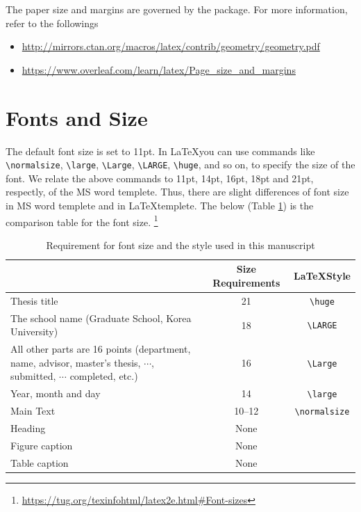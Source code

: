 \documentclass{report}
\begin{document}
The paper size and margins are governed by the  package.
For more information, refer to the followings
\begin{itemize}
\item
\url{http://mirrors.ctan.org/macros/latex/contrib/geometry/geometry.pdf}
\item
\url{https://www.overleaf.com/learn/latex/Page_size_and_margins}
\end{itemize}

\section{Fonts and Size}\label{sec:font}

The default font size is set to 11pt.
In \LaTeX you can use commands like \verb|\normalsize|, \verb|\large|, \verb|\Large|, \verb|\LARGE|, \verb|\huge|, and so on, to specify the size of the font.
We relate the above commands to 11pt, 14pt, 16pt, 18pt and 21pt, respectly, of the MS word templete.
Thus, there are slight differences of font size in MS word templete and in \LaTeX templete.
The below (Table \ref{tab:font size}) is the comparison table for the font size.
\footnote{\url{https://tug.org/texinfohtml/latex2e.html#Font-sizes}}
\begin{table}[h]\centering
\begin{tabular}{>{\centering\arraybackslash}p{6cm}cc}
\hline
&Size Requirements&\LaTeX Style\\\hline
Thesis title			&21&\verb|\huge|\\\hline
The school name (Graduate School, Korea University)
					&18&\verb|\LARGE|\\\hline
All other parts are 16 points (department, name, advisor, master's thesis, \(\cdots\), submitted, \(\cdots\) completed, etc.)	
					&16&\verb|\Large|\\\hline
Year, month and day	&14&\verb|\large|\\\hline
Main Text			&10--12&\verb|\normalsize|\\\hline
Heading				&None&\\\hline
Figure caption			&None&\\\hline
Table caption			&None&\\\hline
\end{tabular}
\caption{Requirement for font size and the style used in this manuscript}\label{tab:font size}
\end{table}

\end{document}
